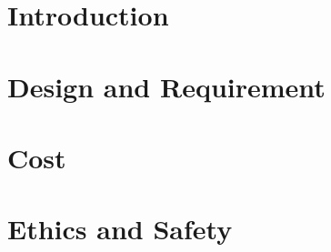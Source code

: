 \documentclass[12pt]{article}
\begin{document}

\clearpage
\section{Introduction}

\clearpage

\clearpage
\section{Design and Requirement}

\clearpage

\clearpage
\section{Cost}

\clearpage

\clearpage
\section{Ethics and Safety}

\clearpage


%     


\end{document}
